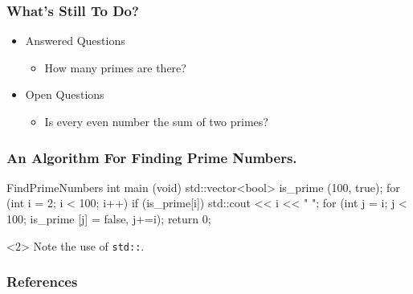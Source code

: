 \documentclass{beamer}
\begin{document}
\begin{frame}[t]
  \frametitle{What's Still To Do?}
  \begin{itemize}
    \item Answered Questions
    \begin{itemize}
      \item How many primes are there?
    \end{itemize}
    \item Open Questions
    \begin{itemize}
      \item Is every even number the sum of two primes?
    \end{itemize}
  \end{itemize}
\end{frame}

\begin{frame}[fragile]
  \frametitle{An Algorithm For Finding Prime Numbers.}
  \begin{Code}[C++]{FindPrimeNumbers}
int main (void)
{
std::vector<bool> is_prime (100, true);
for (int i = 2; i < 100; i++)
if (is_prime[i])
{
  std::cout << i << " ";
  for (int j = i; j < 100; is_prime [j] = false, j+=i);
  }
  return 0;
}
  \end{Code}
  \begin{uncoverenv}<2>
    Note the use of \verb|std::|.
  \end{uncoverenv}
\end{frame}


\nocite{*}
\begin{frame}[allowframebreaks]
  \frametitle{References}
  \printbibliography
\end{frame}
\end{document}
